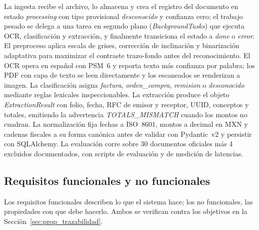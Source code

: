 La ingesta recibe el archivo, lo almacena y crea el registro del documento en estado \textit{processing} con tipo provisional \textit{desconocido} y confianza cero; el trabajo pesado se delega a una tarea en segundo plano (\textit{BackgroundTasks}) que ejecuta OCR, clasificación y extracción, y finalmente transiciona el estado a \textit{done} o \textit{error}\cite{fastapi_docs}. El preproceso aplica escala de grises, corrección de inclinación y binarización adaptativa para maximizar el contraste trazo-fondo antes del reconocimiento\cite{bradski_opencv_2008, opencv_docs}. El OCR opera en español con PSM~6 y reporta texto más confianza por palabra; los PDF con capa de texto se leen directamente y los escaneados se renderizan a imagen\cite{tesseract_ocr, smith_tesseract_2007}. La clasificación asigna \textit{factura}, \textit{orden\_compra}, \textit{remision} o \textit{desconocido} mediante reglas lexicales inspeccionables\cite{sokolova_metrics_2009}. La extracción produce el objeto \textit{ExtractionResult} con folio, fecha, RFC de emisor y receptor, UUID, conceptos y totales, emitiendo la advertencia \textit{TOTALS\_MISMATCH} cuando los montos no cuadran\cite{structured_extraction_2023}. La normalización fija fechas a ISO~8601, montos a decimal en MXN y cadenas fiscales a su forma canónica antes de validar con Pydantic~v2 y persistir con SQLAlchemy\cite{pydantic_v2_2024, sqlalchemy_docs_2024}. La evaluación corre sobre 30 documentos oficiales más 4 excluidos documentados, con scripts de evaluación y de medición de latencias\cite{structured_extraction_2023, sokolova_metrics_2009}.

\subsection{Requisitos funcionales y no funcionales} \label{sec:prop_requisitos}

Los requisitos funcionales describen lo que el sistema hace; los no funcionales, las propiedades con que debe hacerlo. Ambos se verifican contra los objetivos en la Sección~\ref{sec:prop_trazabilidad}.

